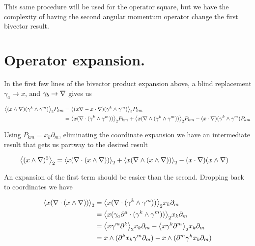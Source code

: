 This same procedure will be used for the operator square, but we have the complexity of having the second angular momentum operator change the first bivector result.

\section{Operator expansion.}

In the first few lines of the bivector product expansion above, a blind replacement $\gamma_a \rightarrow x$, and $\gamma_b \rightarrow \nabla$ gives us

\begin{align*}
{\left\langle{{ (x \wedge \nabla) (\gamma^k \wedge \gamma^m) }}\right\rangle}_{2} P_{km} 
&= 
{\left\langle{{ (x \nabla- x \cdot \nabla) (\gamma^k \wedge \gamma^m) }}\right\rangle}_{2} P_{km} \\
&= 
{\left\langle{{ x (\nabla\cdot (\gamma^k \wedge \gamma^m)) }}\right\rangle}_{2} P_{km} 
+ {\left\langle{{ x (\nabla\wedge (\gamma^k \wedge \gamma^m)) }}\right\rangle}_{2} P_{km} 
- (x \cdot \nabla) (\gamma^k \wedge \gamma^m) P_{km} \\
\end{align*}

Using $P_{km} = x_k \partial_m$, eliminating the coordinate expansion we have an intermediate result that gets us partway to the desired result

\begin{align}\label{eqn:bivectorSelect:goo2}
{\left\langle{{ (x \wedge \nabla)^2 }}\right\rangle}_{2}
&=
{\left\langle{{ x (\nabla\cdot (x \wedge \nabla)) }}\right\rangle}_{2} 
+ {\left\langle{{ x (\nabla\wedge (x \wedge \nabla)) }}\right\rangle}_{2} 
- (x \cdot \nabla) (x \wedge \nabla) 
\end{align}

An expansion of the first term should be easier than the second.  Dropping back to coordinates we have

\begin{align*}
{\left\langle{{ x (\nabla\cdot (x \wedge \nabla)) }}\right\rangle}_{2} 
&=
{\left\langle{{ x (\nabla\cdot (\gamma^k \wedge \gamma^m)) }}\right\rangle}_{2} x_k \partial_m \\
&=
{\left\langle{{ x (\gamma_a \partial^a \cdot (\gamma^k \wedge \gamma^m)) }}\right\rangle}_{2} x_k \partial_m \\
&=
{\left\langle{{ x \gamma^m \partial^k }}\right\rangle}_{2} x_k \partial_m 
-{\left\langle{{ x \gamma^k \partial^m }}\right\rangle}_{2} x_k \partial_m  \\
&=
x \wedge (\partial^k x_k \gamma^m \partial_m )
- x \wedge (\partial^m \gamma^k x_k \partial_m ) \\
\end{align*}

